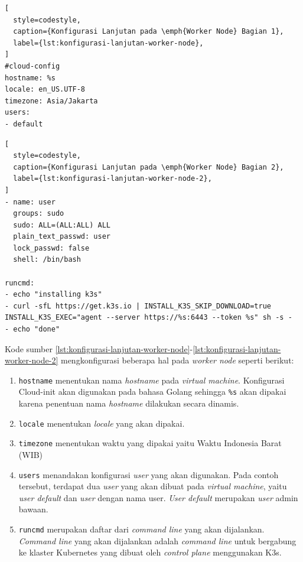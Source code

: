 \begin{lstlisting}[
  style=codestyle,
  caption={Konfigurasi Lanjutan pada \emph{Worker Node} Bagian 1},
  label={lst:konfigurasi-lanjutan-worker-node},
]
#cloud-config
hostname: %s
locale: en_US.UTF-8
timezone: Asia/Jakarta
users:
- default
\end{lstlisting}

\clearpage

\begin{lstlisting}[
  style=codestyle,
  caption={Konfigurasi Lanjutan pada \emph{Worker Node} Bagian 2},
  label={lst:konfigurasi-lanjutan-worker-node-2},
]
- name: user
  groups: sudo
  sudo: ALL=(ALL:ALL) ALL
  plain_text_passwd: user
  lock_passwd: false
  shell: /bin/bash

runcmd:
- echo "installing k3s"
- curl -sfL https://get.k3s.io | INSTALL_K3S_SKIP_DOWNLOAD=true INSTALL_K3S_EXEC="agent --server https://%s:6443 --token %s" sh -s -
- echo "done"
\end{lstlisting}

Kode sumber \ref{lst:konfigurasi-lanjutan-worker-node}-\ref{lst:konfigurasi-lanjutan-worker-node-2}
mengkonfigurasi beberapa hal pada \emph{worker node} seperti berikut:

\begin{enumerate}
  
  \item \lstinline{hostname} menentukan nama \emph{hostname} pada \emph{virtual machine}.
    Konfigurasi Cloud-init akan digunakan pada bahasa Golang sehingga \lstinline{%s}
    akan dipakai karena penentuan nama \emph{hostname} dilakukan secara dinamis.

  \item \lstinline{locale} menentukan \emph{locale} yang akan dipakai.

  \item \lstinline{timezone} menentukan waktu yang dipakai yaitu Waktu Indonesia Barat (WIB)

  \item \lstinline{users} menandakan konfigurasi \emph{user} yang akan digunakan. Pada
    contoh tersebut, terdapat dua \emph{user} yang akan dibuat pada \emph{virtual machine},
    yaitu \emph{user default} dan \emph{user} dengan nama user. \emph{User default} merupakan
    \emph{user} admin bawaan.

  \item \lstinline{runcmd} merupakan daftar dari \emph{command line} yang akan dijalankan.
    \emph{Command line} yang akan dijalankan adalah \emph{command line} untuk bergabung ke
    klaster Kubernetes yang dibuat oleh \emph{control plane} menggunakan K3s.

\end{enumerate}

